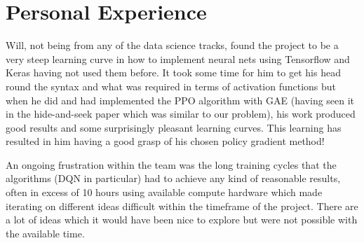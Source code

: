 \documentclass{article}
\begin{document}
\section{Personal Experience} \label{Personal Experience}

Will, not being from any of the data science tracks, found the project to be a very steep learning curve in how to implement neural nets using Tensorflow and Keras having not used them before.
It took some time for him to get his head round the syntax and what was required in terms of activation functions but when he did and had implemented the PPO algorithm with GAE (having seen it in the hide-and-seek paper \citep{emergenttoolusage} which was similar to our problem), his work produced good results and some surprisingly pleasant learning curves. This learning has resulted in him having a good grasp of his chosen policy gradient method!

An ongoing frustration within the team was the long training cycles that the algorithms (DQN in particular) had to achieve any kind of reasonable results, often in excess of 10 hours using available compute hardware which made iterating on different ideas difficult within the timeframe of the project. There are a lot of ideas which it would have been nice to explore but were not possible with the available time.




\end{document}
